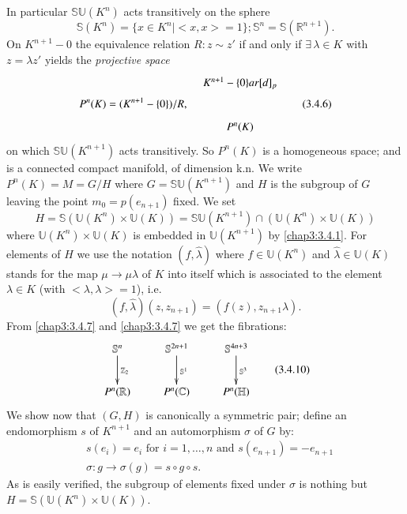 In particular $\mathbb{S}\mathbb{U}(K^{n})$ acts transitively on the
sphere
\begin{equation*}
\mathbb{S}(K^{n})=\{x\in
K^{n}|<x,x>=1\};\mathbb{S}^{n}=\mathbb{S}(\mathbb{R}^{n+1}).\tag{3.4.5}\label{chap3:3.4.5}   
\end{equation*} 
On $K^{n+1}-0$ the equivalence relation $R:z {\sim} z'$ if and only if
$\exists\, \lambda\in K$ with $z=\lambda z'$ yields the {\em
  projective space}
\begin{equation*}
P^{n}(K)=(K^{n+1}-\{0\})/R,\quad 
\vcenter{\xymatrix{
K^{n+1}-\{0\}ar[d]_{p}\\
P^{n}(K)
}}\tag{3.4.6}\label{chap3:3.4.6}
\end{equation*}
on which $\mathbb{S}\mathbb{U}(K^{n+1})$ acts transitively. So
$P^{n}(K)$ is a homogeneous space; and is a connected compact
manifold, of dimension k.n. We write $P^{n}(K)=M=G/H$ where
$G=\mathbb{S}\mathbb{U}(K^{n+1})$ and $H$ is the subgroup of $G$
leaving the point $m_{0}=p(e_{n+1})$ fixed. We set
\begin{equation*}
H=\mathbb{S}(\mathbb{U}(K^{n})\times\mathbb{U}(K))=\mathbb{S}\mathbb{U}(K^{n+1})\cap
(\mathbb{U}(K^{n})\times\mathbb{U}(K))\tag{3.4.7}\label{chap3:3.4.7} 
\end{equation*}
where $\mathbb{U}(K^{n})\times\mathbb{U}(K)$ is embedded in
$\mathbb{U}(K^{n+1})$ by \eqref{chap3:3.4.1}. For elements of $H$ we use the
notation $(f,\widehat{\lambda})$ where $f\in \mathbb{U}(K^{n})$ and
$\widehat{\lambda}\in\mathbb{U}(K)$ stands for the map
$\mu\to\mu\lambda$ of $K$ into itself which is \pageoriginale
associated to the element $\lambda\in K$ (with $<\lambda,\lambda>=1$),
i.e.
\begin{equation*}
(f,\widehat{\lambda})(z,z_{n+1})=(f(z),z_{n+1}\lambda).\tag{3.4.8}\label{chap3:3.4.8} 
\end{equation*}
From \eqref{chap3:3.4.7} and \eqref{chap3:3.4.7} we get the fibrations:
\begin{equation*}
\vcenter{\xymatrix{
\mathbb{S}^{n}\ar[d]^{\mathbb{Z}_{2}}\ar@{}[r] &
\mathbb{S}^{2n+1}\ar[d]^{\mathbb{S}^{1}}\ar@{}[r] &
\mathbb{S}^{4n+3}\ar[d]^{\mathbb{S}^{3}}\\
P^{n}(\mathbb{R}) & P^{n}(\mathbb{C}) & P^{n}(\mathbb{H})
}}
\tag{3.4.10}\label{chap3:3.4.10}
\end{equation*}
We show now that $(G,H)$ is canonically a symmetric pair; define an
endomorphism $s$ of $K^{n+1}$ and an automorphism $\sigma$ of $G$ by:
\begin{equation*}
\begin{split}
& s(e_{i})=e_{i}\text{ \ for \ } i=1,\ldots,n\text{ \ and \ } s(e_{n+1})=-e_{n+1}\\
& \sigma:g\to \sigma(g)=s\circ g\circ s.
\end{split}\tag{3.4.11}\label{chap3:3.4.11}
\end{equation*}
As is easily verified, the subgroup of elements fixed under $\sigma$
is nothing but $H=\mathbb{S}(\mathbb{U}(K^{n})\times\mathbb{U}(K))$.

